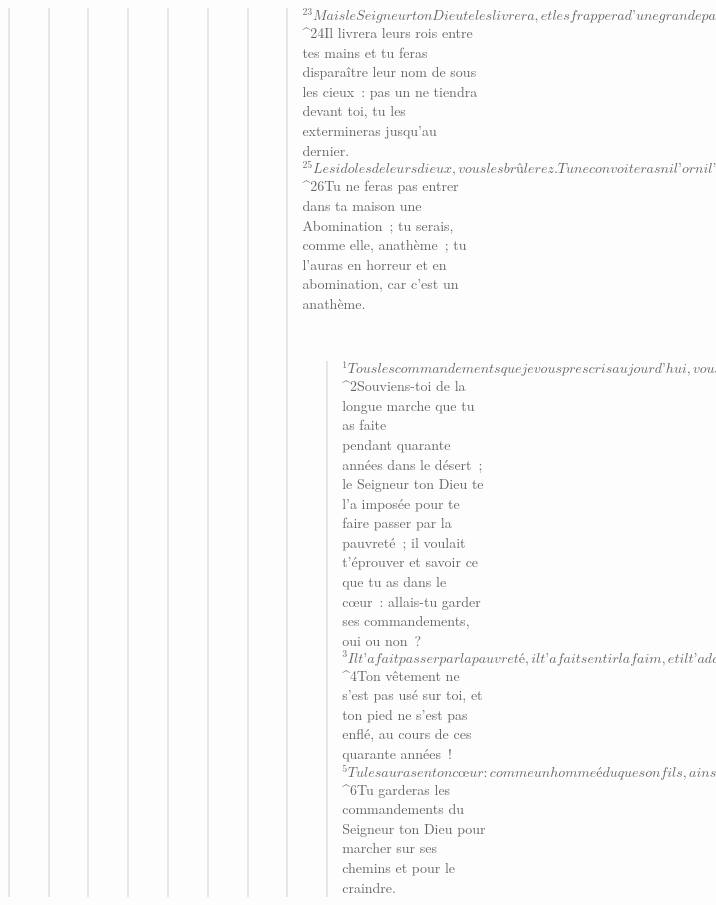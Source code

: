 \begin{verse}
\begin{verse}
\begin{verse}
\begin{verse}
\begin{verse}
\begin{verse}
\begin{verse}
\begin{verse}
${}^{23}Mais le Seigneur ton Dieu te les livrera, et les frappera d’une grande panique jusqu’à ce qu’elles soient détruites. 
${}^{24}Il livrera leurs rois entre tes mains et tu feras disparaître leur nom de sous les cieux : pas un ne tiendra devant toi, tu les extermineras jusqu’au dernier.
${}^{25}Les idoles de leurs dieux, vous les brûlerez. Tu ne convoiteras ni l’or ni l’argent qui les recouvrent, et tu ne les prendras pas, de peur qu’ils ne soient pour toi un piège ; car, pour le Seigneur ton Dieu, c’est une abomination. 
${}^{26}Tu ne feras pas entrer dans ta maison une Abomination ; tu serais, comme elle, anathème ; tu l’auras en horreur et en abomination, car c’est un anathème.
      
         
      \bchapter{}
      \begin{verse}
${}^{1}Tous les commandements que je vous prescris aujourd’hui, vous veillerez à les mettre en pratique, afin que vous viviez, deveniez de plus en plus nombreux et entriez en possession du pays que le Seigneur a juré de donner à vos pères. 
${}^{2}Souviens-toi de la longue marche que tu as faite\\pendant quarante années dans le désert ; le Seigneur ton Dieu te l’a imposée pour te faire passer par la pauvreté ; il voulait t’éprouver et savoir ce que tu as dans le cœur : allais-tu garder ses commandements, oui ou non ? 
${}^{3}Il t’a fait passer par la pauvreté, il t’a fait sentir la faim, et il t’a donné à manger la manne – cette nourriture que ni toi ni tes pères n’aviez connue – pour que tu saches que l’homme ne vit pas seulement de pain, mais de tout ce qui vient de la bouche du Seigneur. 
${}^{4}Ton vêtement ne s’est pas usé sur toi, et ton pied ne s’est pas enflé, au cours de ces quarante années ! 
${}^{5}Tu le sauras en ton cœur : comme un homme éduque son fils, ainsi le Seigneur ton Dieu fait ton éducation. 
${}^{6}Tu garderas les commandements du Seigneur ton Dieu pour marcher sur ses chemins et pour le craindre.
      

\end{verse}
\end{verse}
\end{verse}
\end{verse}
\end{verse}
\end{verse}
\end{verse}
\end{verse}
\end{verse}
